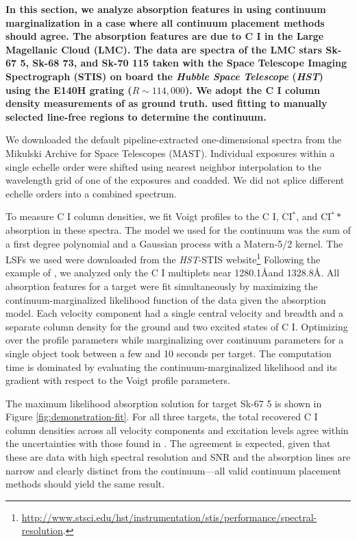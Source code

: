 \documentclass[trackchanges]{aastex62}
\begin{document}
{ \bf
In this section, we analyze absorption features in using continuum marginalization in a case where all continuum placement methods should agree.
The absorption features are due to {C \small{I}} in the Large Magellanic Cloud (LMC).
The data are spectra of the LMC stars Sk-67 5, Sk-68 73, and Sk-70 115 taken with the Space Telescope Imaging Spectrograph (STIS) \citep{1998PASP..110.1183W} on board the \emph{Hubble Space Telescope} (\emph{HST}) using the E140H grating ($R \sim 114,000$).
We adopt the {C \small{I}} column density measurements of \citet{Welty:2016} as ground truth.
\citet{Welty:2016} used fitting to manually selected line-free regions to determine the continuum.

We downloaded the default pipeline-extracted one-dimensional spectra from the Mikulski Archive for Space Telescopes (MAST).
Individual exposures within a single echelle order were shifted using nearest neighbor interpolation to the wavelength grid of one of the exposures and coadded.
We did not splice different echelle orders into a combined spectrum.

To measure {C \small{I}} column densities, we fit Voigt profiles to the {C \small{I}}, C\small{I}$^*$, and C\small{I}$^**$ absorption in these spectra.
The model we used for the continuum was the sum of a first degree polynomial and a Gaussian process with a Matern-5/2 kernel.
The LSFs we used were downloaded from the \emph{HST}-STIS website\footnote{\url{http://www.stsci.edu/hst/instrumentation/stis/performance/spectral-resolution}.}
Following the example of \citet{Welty:2016}, we analyzed only the {C \small{I}} multiplets near 1280.1\AA and 1328.8\AA.
All absorption features for a target were fit simultaneously by maximizing the continuum-marginalized likelihood function of the data given the absorption model.
Each velocity component had a single central velocity and breadth and a separate column density for the ground and two excited states of {C \small{I}}.
Optimizing over the profile parameters while marginalizing over continuum parameters for a single object took between a few and 10 seconds per target.
The computation time is dominated by evaluating the continuum-marginalized likelihood and its gradient with respect to the Voigt profile parameters.

The maximum likelihood absorption solution for target Sk-67 5 is shown in Figure \ref{fig:demonstration-fit}.
For all three targets, the total recovered {C \small{I}} column densities across all velocity components and excitation levels agree within the uncertainties with those found in \citet{Welty:2016}.
The agreement is expected, given that these are data with high spectral resolution and SNR and the absorption lines are narrow and clearly distinct from the continuum---all valid continuum placement methods should yield the same result.

}
\end{document}
